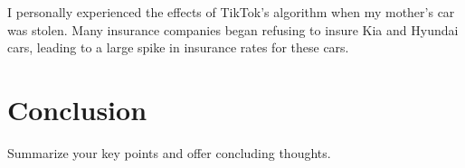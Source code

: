 \documentclass[12pt]{article}
\begin{document}
I personally experienced the effects of TikTok's algorithm when my mother's
car was stolen. Many insurance companies began refusing to insure Kia and
Hyundai cars, leading to a large spike in insurance rates for these cars.

\section{Conclusion}
Summarize your key points and offer concluding thoughts.

\end{document}
